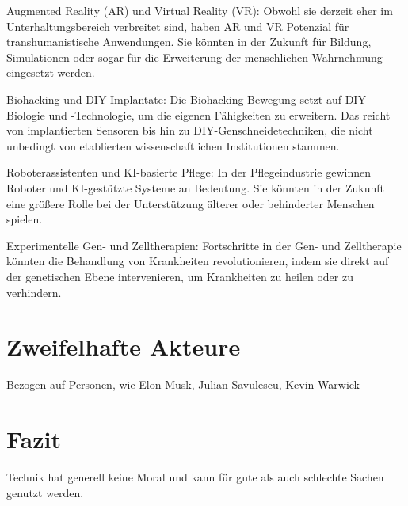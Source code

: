 \documentclass[a4paper,
DIV=13,
12pt,
BCOR=10mm,
department=FakEI,
twoside,
parskip=half,
automark,
]{OTHRartcl}
\begin{document}
Augmented Reality (AR) und Virtual Reality (VR): Obwohl sie derzeit eher im Unterhaltungsbereich verbreitet sind, haben AR und VR Potenzial für transhumanistische Anwendungen. Sie könnten in der Zukunft für Bildung, Simulationen oder sogar für die Erweiterung der menschlichen Wahrnehmung eingesetzt werden.

Biohacking und DIY-Implantate: Die Biohacking-Bewegung setzt auf DIY-Biologie und -Technologie, um die eigenen Fähigkeiten zu erweitern. Das reicht von implantierten Sensoren bis hin zu DIY-Genschneidetechniken, die nicht unbedingt von etablierten wissenschaftlichen Institutionen stammen.

Roboterassistenten und KI-basierte Pflege: In der Pflegeindustrie gewinnen Roboter und KI-gestützte Systeme an Bedeutung. Sie könnten in der Zukunft eine größere Rolle bei der Unterstützung älterer oder behinderter Menschen spielen.

Experimentelle Gen- und Zelltherapien: Fortschritte in der Gen- und Zelltherapie könnten die Behandlung von Krankheiten revolutionieren, indem sie direkt auf der genetischen Ebene intervenieren, um Krankheiten zu heilen oder zu verhindern.


\section*{Zweifelhafte Akteure}
Bezogen auf Personen, wie Elon Musk, Julian Savulescu, Kevin Warwick

\section*{Fazit}
Technik hat generell keine Moral und kann für gute als auch schlechte Sachen genutzt werden.
\newpage


\newpage
\end{document}
